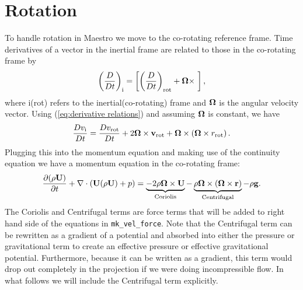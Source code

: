 \section{Rotation}\label{Sec:Rotation}
To handle rotation in Maestro we move to the co-rotating reference frame.  Time
derivatives of a vector in the inertial frame are related to those in the 
co-rotating frame by
\begin{equation}\label{eq:derivative relations}
  \left(\frac{D}{Dt}\right)_\text{i} = 
  \left[\left(\frac{D}{Dt}\right)_\text{rot} + \Omegab\times\ \right],
\end{equation}
where i(rot) refers to the inertial(co-rotating) frame and ${\bf \Omega}$ is
the angular velocity vector.  Using (\ref{eq:derivative relations}) and 
assuming ${\bf \Omega}$ is constant, we have
\begin{equation}\label{eq:rotational velocity relation}
  \frac{Dv_\text{i}}{Dt} = \frac{Dv_\text{rot}}{Dt} + 
  2{\bf \Omega} \times \mathbf{v_\text{rot}} +
  {\bf \Omega}\times\left({\bf \Omega}\times r_\text{rot}\right).
\end{equation}
Plugging this into the momentum equation and making use of the continuity 
equation we have a momentum equation in the co-rotating frame:
\begin{equation}\label{eq:momentum equation with rotation}
  \frac{\partial(\rho\mathbf{U})}{\partial t} + 
  \nabla\cdot\left(\mathbf{U}(\rho\mathbf{U}) + p \right) = 
  \underbrace{-2\rho{\bf \Omega}\times\mathbf{U}}_{\text{Coriolis}} -
  \underbrace{\rho{\bf \Omega}\times\left({\bf \Omega}\times
    {\bf r}\right)}_{\text{Centrifugal}} - 
  \rho \mathbf{g}.
\end{equation}
The Coriolis and Centrifugal terms are force terms that will be added to 
right hand side of the equations in {\tt mk\_vel\_force}.  Note that the 
Centrifugal term can be rewritten as a gradient of a potential and absorbed
into either the pressure or gravitational term to create an effective pressure
or effective gravitational potential.  Furthermore, because it can be written
as a gradient, this term would drop out completely in the projection if we were
doing incompressible flow.
In what follows we will include the Centrifugal term explicitly.


